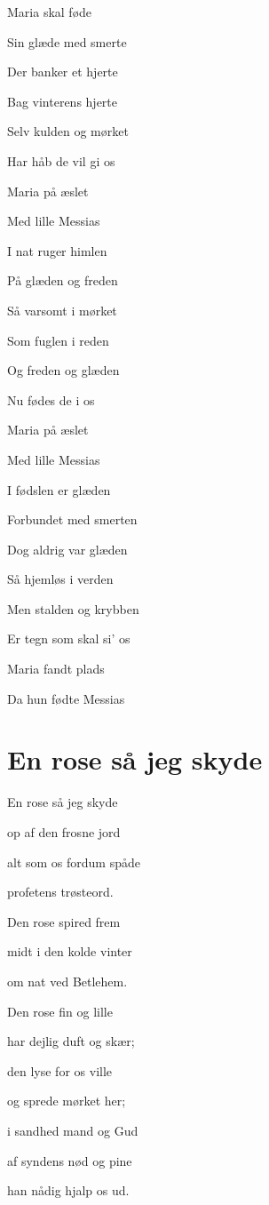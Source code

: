 \documentclass[11pt]{beamer}
\begin{document}
\begin{frame}
Maria skal føde

Sin glæde med smerte

Der banker et hjerte

Bag vinterens hjerte

Selv kulden og mørket

Har håb de vil gi os

Maria på æslet

Med lille Messias
\end{frame}

\begin{frame}
I nat ruger himlen

På glæden og freden

Så varsomt i mørket

Som fuglen i reden

Og freden og glæden

Nu fødes de i os

Maria på æslet

Med lille Messias
\end{frame}

\begin{frame}
I fødslen er glæden

Forbundet med smerten

Dog aldrig var glæden

Så hjemløs i verden

Men stalden og krybben

Er tegn som skal si' os

Maria fandt plads

Da hun fødte Messias
\end{frame}

\toc

\section{En rose så jeg skyde}
\begin{frame}
En rose så jeg skyde

op af den frosne jord

alt som os fordum spåde

profetens trøsteord.

Den rose spired frem

midt i den kolde vinter

om nat ved Betlehem.
\end{frame}

\begin{frame}
Den rose fin og lille

har dejlig duft og skær;

den lyse for os ville

og sprede mørket her;

i sandhed mand og Gud

af syndens nød og pine

han nådig hjalp os ud.
\end{frame}
\end{document}
